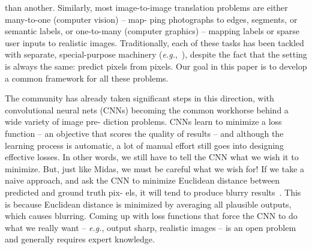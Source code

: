\documentclass[10pt,twocolumn,letterpaper]{article}
\begin{document}
than another. Similarly, most image-to-image translation
problems are either many-to-one (computer vision) – map-
ping photographs to edges, segments, or semantic labels,
or one-to-many (computer graphics) – mapping labels or
sparse user inputs to realistic images. Traditionally, each of
these tasks has been tackled with separate, special-purpose
machinery (\emph{e.g.},~\cite{name7,name15,name11,name1,name3,name37,name21,name26,name9,name42,name46}), despite the fact that the setting is always the same: predict
pixels from pixels. Our goal in this paper is to develop a
common framework for all these problems.
\par The community has already taken significant steps in this
direction, with convolutional neural nets (CNNs) becoming
the common workhorse behind a wide variety of image pre-
diction problems. CNNs learn to minimize a loss function –
an objective that scores the quality of results – and although
the learning process is automatic, a lot of manual effort still
goes into designing effective losses. In other words, we still
have to tell the CNN what we wish it to minimize. But,
just like Midas, we must be careful what we wish for! If
we take a naive approach, and ask the CNN to minimize
Euclidean distance between predicted and ground truth pix-
els, it will tend to produce blurry results~\cite{name46}. This is
because Euclidean distance is minimized by averaging all
plausible outputs, which causes blurring. Coming up with
loss functions that force the CNN to do what we really want
– \emph{e.g.}, output sharp, realistic images – is an open problem
and generally requires expert knowledge.
\end{document}
